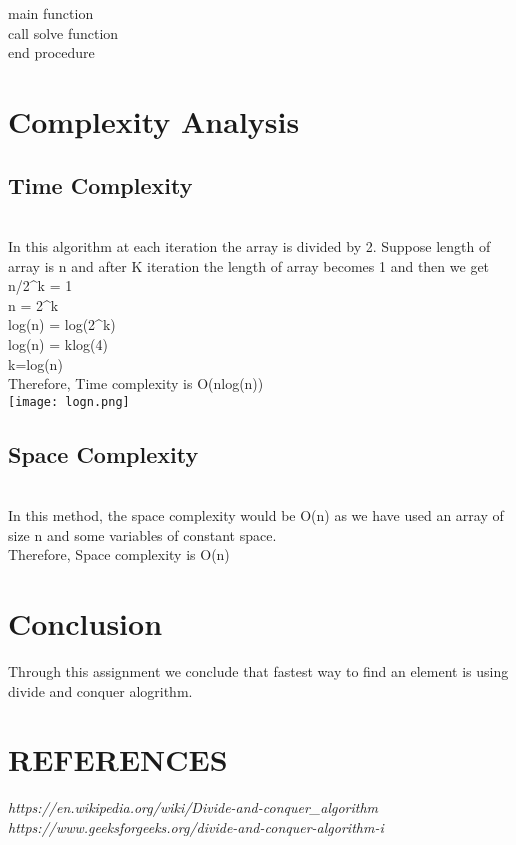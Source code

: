 \documentclass[conference]{IEEEtran}
\begin{document}
main function \\
\indent \hspace{0.5 cm} call solve function \\ 
end procedure

\section{Complexity Analysis}

\subsection{Time Complexity}\\
In this algorithm at each iteration the array is divided by 2. Suppose length of array is n and after K iteration the length of array becomes 1 and then we get\\
n/2^{k} = 1\\
n = 2^{k}\\
log(n) = log(2^{k})\\
log(n) = klog(4)\\
k=log(n)\\

Therefore, Time complexity is O(nlog(n))\\

\texttt{[image: logn.png]}

\subsection{Space Complexity}\\
In this method, the space complexity would be O(n) as we have used an array of size n and some variables of constant space.  \\

Therefore, Space complexity is O(n)\\

\section{Conclusion}
Through this assignment we conclude that fastest way to find an element is using divide and conquer alogrithm.
\section{REFERENCES}
\textit{https://en.wikipedia.org/wiki/Divide-and-conquer_algorithm }\\
\textit{https://www.geeksforgeeks.org/divide-and-conquer-algorithm-i}\\
\end{document}
